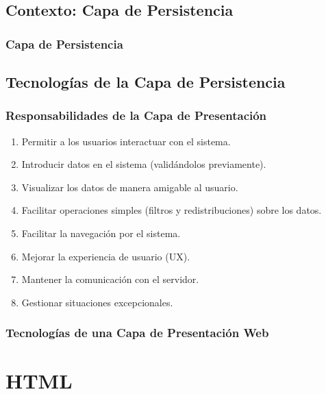 \documentclass[a4paper,slidestop,xcolor=pst,blue]{beamer}
\begin{document}
\subsection{Contexto: Capa de Persistencia}

\begin{frame}
    \frametitle{Capa de Persistencia}
\end{frame}

\subsection{Tecnologías de la Capa de Persistencia}

\begin{frame}[c]
	\frametitle{Responsabilidades de la Capa de Presentación}
	\begin{enumerate}[<+->]
        \item Permitir a los usuarios interactuar con el sistema.
        \item Introducir datos en el sistema (validándolos previamente).
        \item Visualizar los datos de manera amigable al usuario.
        \item Facilitar operaciones simples (filtros y redistribuciones) sobre los datos.
        \item Facilitar la navegación por el sistema.
        \item Mejorar la experiencia de usuario (UX). %
        \item Mantener la comunicación con el servidor.
        \item Gestionar situaciones excepcionales.
	\end{enumerate}
\end{frame}

\begin{frame}[c]
    \frametitle{Tecnologías de una Capa de Presentación Web}
\end{frame}

\section{HTML}
\end{document}
